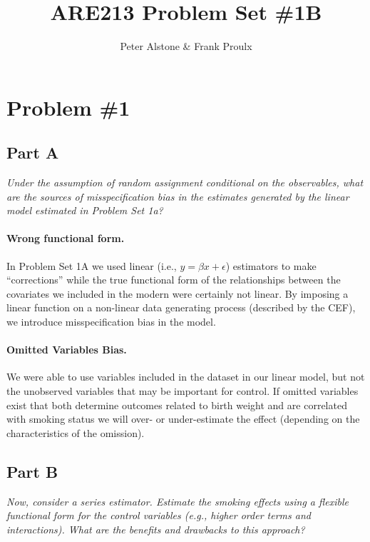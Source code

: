 \documentclass[letterpaper, 12pt]{article}
\begin{document}
\title{ARE213 Problem Set \#1B}
\author{Peter Alstone \& Frank Proulx}
\maketitle

\section{Problem \#1}
\subsection{Part A}
\emph{Under the assumption of random assignment conditional on the observables, what are the sources of misspecification bias in the estimates generated by the linear model estimated in Problem Set 1a?}

\paragraph{Wrong functional form.}
In Problem Set 1A we used linear (i.e., $ y = \beta x + \epsilon$) estimators to make ``corrections'' while the true functional form of the relationships between the covariates we included in the modern were certainly not linear.  By imposing a linear function on a non-linear data generating process (described by the CEF), we introduce misspecification bias in the model.  

\paragraph{Omitted Variables Bias.}  We were able to use variables included in the dataset in our linear model, but not the unobserved variables that may be important for control.  If omitted variables exist that both determine outcomes related to birth weight and are correlated with smoking status we will over- or under-estimate the effect (depending on the characteristics of the omission).   


\subsection{Part B}
\emph{Now, consider a series estimator. Estimate the smoking effects using a flexible functional form for the control variables (e.g., higher order terms and interactions). What are the benefits and drawbacks to this approach?}
\end{document}
